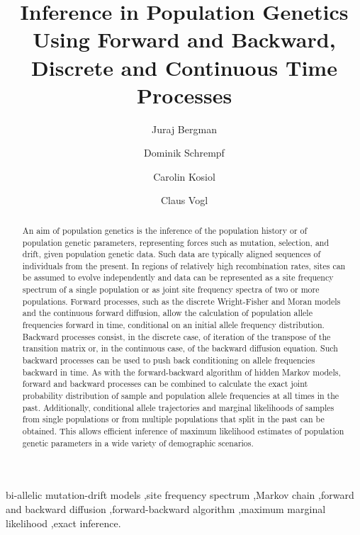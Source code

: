 \documentclass[preprint]{elsarticle}
\begin{document}
\begin{frontmatter}

\title{Inference in Population Genetics Using Forward and Backward, Discrete and Continuous Time Processes}

\author[address1,address2]{Juraj Bergman}
\author[address1,address2]{Dominik Schrempf}
\author[address1,address4]{Carolin Kosiol}
\author[address3]{Claus Vogl}

\address[address1]{Institut f\"ur Populationsgenetik, Vetmeduni Vienna, Veterin\"arplatz 1, A-1210 Wien, Austria}
\address[address2]{Vienna Graduate School of Population Genetics, A-1210 Wien, Austria}
\address[address3]{Institut f\"ur Tierzucht und Genetik, Vetmeduni Vienna, Veterin\"arplatz 1, A-1210 Wien, Austria}
\address[address4]{Centre of Biological Diversity, School of Biology, University of St.~Andrews, St Andrews KY16 9TH, UK}

\begin{abstract}
An aim of population genetics is the inference of the population history or of population genetic parameters, representing forces such as mutation, selection, and drift, given population genetic data. Such data are typically aligned sequences of individuals from the present. In regions of relatively high recombination rates, sites can be assumed to evolve independently and data can be represented as a site frequency spectrum of a single population or as joint site frequency spectra of two or more populations. Forward processes, such as the discrete Wright-Fisher and Moran models and the continuous forward diffusion, allow the calculation of population allele frequencies forward in time, conditional on an initial allele frequency distribution. Backward processes consist, in the discrete case, of iteration of the transpose of the transition matrix or, in the continuous case, of the backward diffusion equation. Such backward processes can be used to push back conditioning on allele frequencies backward in time. As with the forward-backward algorithm of hidden Markov models, forward and backward processes can be combined to calculate the exact joint probability distribution of sample and population allele frequencies at all times in the past. Additionally, conditional allele trajectories and marginal likelihoods of samples from single populations or from multiple populations that split in the past can be obtained. This allows efficient inference of maximum likelihood estimates of population genetic parameters in a wide variety of demographic scenarios.
\end{abstract}
\begin{keyword}
bi-allelic mutation-drift models \sep site frequency spectrum \sep Markov chain \sep forward and backward diffusion \sep forward-backward algorithm \sep maximum marginal likelihood \sep exact inference.
\end{keyword}

\end{frontmatter}
\end{document}
